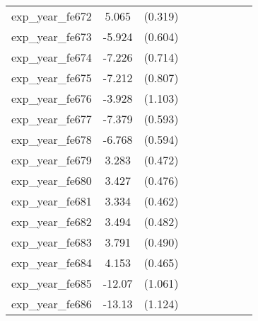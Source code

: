 {\begin{tabular}{l*{4}{cc}}
exp\_year\_fe672&    5.065\sym{***}&  (0.319)&                  &         &                  &         &                  &         \\
exp\_year\_fe673&   -5.924\sym{***}&  (0.604)&                  &         &                  &         &                  &         \\
exp\_year\_fe674&   -7.226\sym{***}&  (0.714)&                  &         &                  &         &                  &         \\
exp\_year\_fe675&   -7.212\sym{***}&  (0.807)&                  &         &                  &         &                  &         \\
exp\_year\_fe676&   -3.928\sym{***}&  (1.103)&                  &         &                  &         &                  &         \\
exp\_year\_fe677&   -7.379\sym{***}&  (0.593)&                  &         &                  &         &                  &         \\
exp\_year\_fe678&   -6.768\sym{***}&  (0.594)&                  &         &                  &         &                  &         \\
exp\_year\_fe679&    3.283\sym{***}&  (0.472)&                  &         &                  &         &                  &         \\
exp\_year\_fe680&    3.427\sym{***}&  (0.476)&                  &         &                  &         &                  &         \\
exp\_year\_fe681&    3.334\sym{***}&  (0.462)&                  &         &                  &         &                  &         \\
exp\_year\_fe682&    3.494\sym{***}&  (0.482)&                  &         &                  &         &                  &         \\
exp\_year\_fe683&    3.791\sym{***}&  (0.490)&                  &         &                  &         &                  &         \\
exp\_year\_fe684&    4.153\sym{***}&  (0.465)&                  &         &                  &         &                  &         \\
exp\_year\_fe685&   -12.07\sym{***}&  (1.061)&                  &         &                  &         &                  &         \\
exp\_year\_fe686&   -13.13\sym{***}&  (1.124)&                  &         &                  &         &                  &         \\

\end{tabular}}
